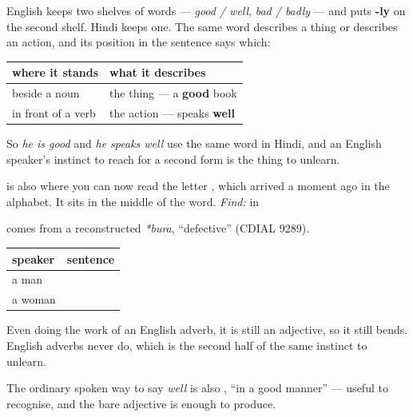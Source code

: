 \begin{cousinweb}
English keeps two shelves of words — \emph{good / well}, \emph{bad / badly} — and puts \textbf{-ly} on the second shelf. Hindi keeps one. The same word describes a thing or describes an action, and its position in the sentence says which:

\noindent
\begin{tabularx}{\linewidth}{@{}>{\raggedright\arraybackslash}X>{\raggedright\arraybackslash}X@{}}
\toprule
\textbf{where it stands} & \textbf{what it describes} \\
\midrule
beside a noun & the thing — a \textbf{good} book \\
in front of a verb & the action — speaks \textbf{well} \\
\bottomrule
\end{tabularx}

So \emph{he is good} and \emph{he speaks well} use the same word in Hindi, and an English speaker's instinct to reach for a second form is the thing to unlearn.

\textbf{} is also where you can now read the letter \textbf{}, which arrived a moment ago in the alphabet. It sits in the middle of the word. \emph{Find:} \textbf{} in \textbf{}

\textbf{} comes from a reconstructed \emph{*bura}, \textquotedblleft{}defective\textquotedblright{} (CDIAL 9289).
\end{cousinweb}

\begin{grammarlens}[title={Grammar Lens: it still agrees}]
\noindent
\begin{tabularx}{\linewidth}{@{}>{\raggedright\arraybackslash}X>{\raggedright\arraybackslash}X@{}}
\toprule
\textbf{speaker} & \textbf{sentence} \\
\midrule
a man & \hi{वह} \hi{अच्छा} \hi{बोलता} \hi{है।} \\
a woman & \hi{वह} \hi{अच्छी} \hi{बोलती} \hi{है।} \\
\bottomrule
\end{tabularx}

Even doing the work of an English adverb, it is still an adjective, so it still bends. English adverbs never do, which is the second half of the same instinct to unlearn.

The ordinary spoken way to say \emph{well} is also \textbf{ }, \textquotedblleft{}in a good manner\textquotedblright{} — useful to recognise, and the bare adjective is enough to produce.
\end{grammarlens}

